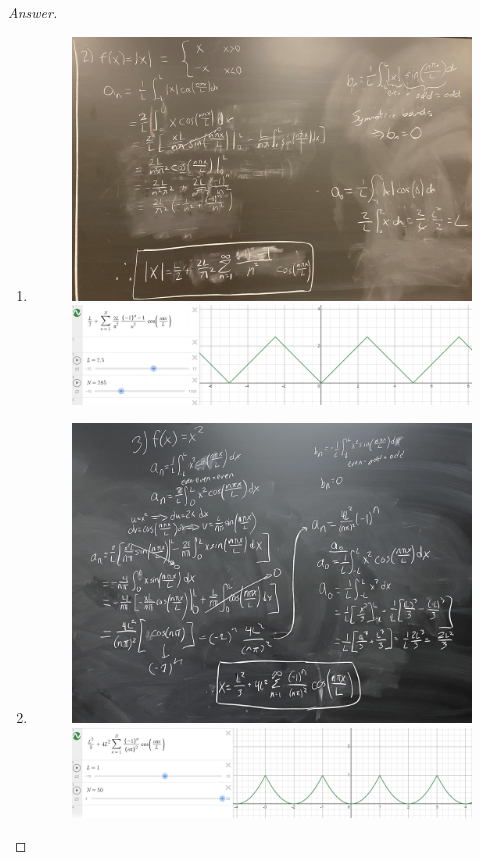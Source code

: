 \documentclass{article}
\theoremstyle{definition}
\renewcommand\qedsymbol{$\blacksquare$}
\newenvironment{ans}{\begin{proof}[Answer]\renewcommand{\qedsymbol}{}}{\end{proof}}
\begin{document}
\begin{ans}
\begin{enumerate}
        \item \phantom{.}
        \begin{figure}[H]
            \centering
            \includegraphics[width = \textwidth]{Problem 2-2.jpg}
            \includegraphics[width = \textwidth]{Problem 2.2.png}
        \end{figure}
\newpage
        \item \phantom{.}
        \begin{figure}[H]
            \centering
            \includegraphics[width = \textwidth]{Problem 2-3.jpg}
            \includegraphics[width = \textwidth]{Problem 2.3.png}
        \end{figure}
    \end{enumerate}
\end{ans}
\end{document}
